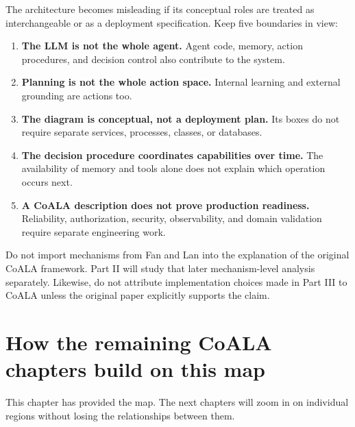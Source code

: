 The architecture becomes misleading if its conceptual roles are treated as interchangeable or as a deployment specification. Keep five boundaries in view:

\begin{enumerate}
  \item \textbf{The LLM is not the whole agent.} Agent code, memory, action procedures, and decision control also contribute to the system.
  \item \textbf{Planning is not the whole action space.} Internal learning and external grounding are actions too.
  \item \textbf{The diagram is conceptual, not a deployment plan.} Its boxes do not require separate services, processes, classes, or databases.
  \item \textbf{The decision procedure coordinates capabilities over time.} The availability of memory and tools alone does not explain which operation occurs next.
  \item \textbf{A CoALA description does not prove production readiness.} Reliability, authorization, security, observability, and domain validation require separate engineering work.    
\end{enumerate}

\begin{warningbox}
Do not import mechanisms from Fan and Lan into the explanation of the original CoALA framework. Part II will study that later mechanism-level analysis separately. Likewise, do not attribute implementation choices made in Part III to CoALA unless the original paper explicitly supports the claim.
\end{warningbox}

\section{How the remaining CoALA chapters build on this map}

This chapter has provided the map. The next chapters will zoom in on individual regions without losing the relationships between them.

